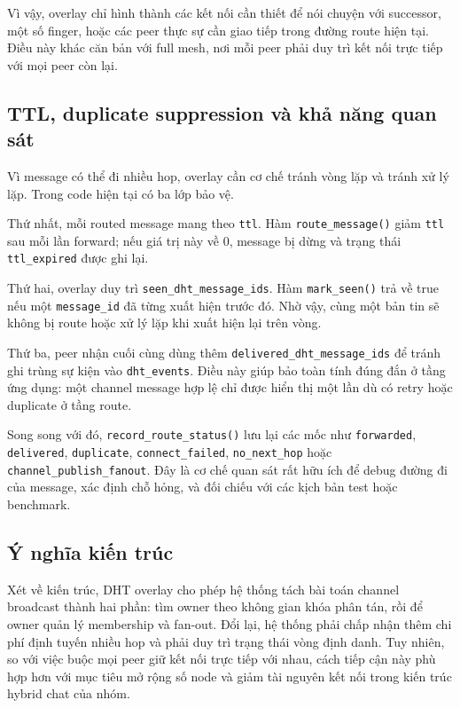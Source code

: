 Vì vậy, overlay chỉ hình thành các kết nối cần thiết để nói chuyện với successor, một số finger, hoặc các peer thực sự cần giao tiếp trong đường route hiện tại. Điều này khác căn bản với full mesh, nơi mỗi peer phải duy trì kết nối trực tiếp với mọi peer còn lại.

\subsection{TTL, duplicate suppression và khả năng quan sát}
Vì message có thể đi nhiều hop, overlay cần cơ chế tránh vòng lặp và tránh xử lý lặp. Trong code hiện tại có ba lớp bảo vệ.

Thứ nhất, mỗi routed message mang theo \texttt{ttl}. Hàm \texttt{route\_message()} giảm \texttt{ttl} sau mỗi lần forward; nếu giá trị này về 0, message bị dừng và trạng thái \texttt{ttl\_expired} được ghi lại.

Thứ hai, overlay duy trì \texttt{seen\_dht\_message\_ids}. Hàm \texttt{mark\_seen()} trả về true nếu một \texttt{message\_id} đã từng xuất hiện trước đó. Nhờ vậy, cùng một bản tin sẽ không bị route hoặc xử lý lặp khi xuất hiện lại trên vòng.

Thứ ba, peer nhận cuối cùng dùng thêm \texttt{delivered\_dht\_message\_ids} để tránh ghi trùng sự kiện vào \texttt{dht\_events}. Điều này giúp bảo toàn tính đúng đắn ở tầng ứng dụng: một channel message hợp lệ chỉ được hiển thị một lần dù có retry hoặc duplicate ở tầng route.

Song song với đó, \texttt{record\_route\_status()} lưu lại các mốc như \texttt{forwarded}, \texttt{delivered}, \texttt{duplicate}, \texttt{connect\_failed}, \texttt{no\_next\_hop} hoặc \texttt{channel\_publish\_fanout}. Đây là cơ chế quan sát rất hữu ích để debug đường đi của message, xác định chỗ hỏng, và đối chiếu với các kịch bản test hoặc benchmark.

\subsection{Ý nghĩa kiến trúc}
Xét về kiến trúc, DHT overlay cho phép hệ thống tách bài toán channel broadcast thành hai phần: tìm owner theo không gian khóa phân tán, rồi để owner quản lý membership và fan-out. Đổi lại, hệ thống phải chấp nhận thêm chi phí định tuyến nhiều hop và phải duy trì trạng thái vòng định danh. Tuy nhiên, so với việc buộc mọi peer giữ kết nối trực tiếp với nhau, cách tiếp cận này phù hợp hơn với mục tiêu mở rộng số node và giảm tài nguyên kết nối trong kiến trúc hybrid chat của nhóm.

